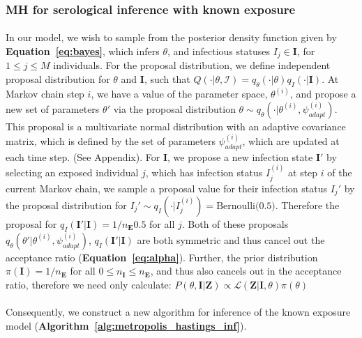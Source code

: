 \subsubsection{MH for serological inference with known exposure }

\paragraph{}In our model, we wish to sample from the posterior density function given by \textbf{Equation~\ref{eq:bayes}}, which infers $\theta$, and infectious statuses ${I_j} \in \mathbf{I}$, for $1 \leq j \leq M$ individuals. For the proposal distribution, we define independent proposal distribution for $\theta$ and $\mathbf{I}$,  such that $Q(\cdot | \theta, \mathcal{I}) = q_\theta(\cdot |\theta)q_I(\cdot |\mathbf{I})$. At Markov chain step $i$, we have a value of the parameter space, $\theta^{(i)}$, and propose a new set of parameters $\theta'$ via the proposal distribution $\theta \sim q_\theta(\cdot | \theta^{(i)}, \psi^{(i)}_{adapt})$. This proposal is a multivariate normal distribution with an adaptive covariance matrix, which is defined by the set of parameters $\psi^{(i)}_{adapt}$, which are updated at each time step.\cite{Roberts2012-ju, Andrieu2008-yx} (See Appendix). For $\mathbf{I}$, we propose a new infection state $\mathbf{I}'$ by selecting an exposed individual $j$, which has infection status $I_j^{(i)}$ at step $i$ of the current Markov chain, we sample a proposal value for their infection status $I_j'$ by the proposal distribution for $I_j' \sim q_I(\cdot | I^{(i)}_j)= \text{Bernoulli(0.5)}$. Therefore the proposal for $q_I(\mathbf{I}'|\mathbf{I}) = 1/n_\mathbf{E}0.5$ for all $j$. Both of these proposals $q_\theta\left(\theta' | \theta^{(i)}, \psi^{(i)}_{adapt}\right)$, $q_I(\mathbf{I}'|\mathbf{I})$ are both symmetric and thus cancel out the acceptance ratio (\textbf{Equation~\ref{eq:alpha}}). Further, the prior distribution $\pi(\mathbf{I}) = 1 / n_\mathbf{E}$ for all $0 \leq n_\mathbf{I} \leq n_\mathbf{E}$, and thus also cancels out in the acceptance ratio, therefore we need only calculate: $P(\theta, \mathbf{I} | \mathbf{Z}) \propto \mathcal{L}(\mathbf{Z} | \mathbf{I}, \theta)\pi(\theta)$

\paragraph{}Consequently, we construct a new algorithm for inference of the known exposure model (\textbf{Algorithm~\ref{alg:metropolis_hastings_inf}}).

